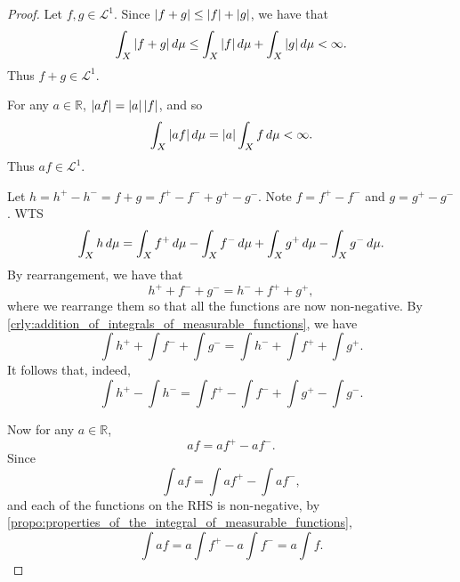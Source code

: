 \documentclass[notoc,notitlepage]{tufte-book}
\begin{document}
\begin{proof}
  Let $f, g \in \mathcal{L}^1$. Since $\left|f + g\right| \leq \left|f\right| + \left|g\right|$,
  we have that
  \begin{equation*}
    \int_{X} \left|f + g\right| \mathop{}\!d{\mu}
    \leq \int_{X} \left|f\right| \mathop{}\!d{\mu} + \int_{X} \left|g\right| \mathop{}\!d{\mu}
    < \infty.
  \end{equation*}
  Thus $f + g \in \mathcal{L}^1$.

  For any $a \in \mathbb{R}$, $\left|af\right| = \left|a\right|\left|f\right|$,
  and so
  \begin{equation*}
    \int_{X} \left|af\right| \mathop{}\!d{\mu} = \left|a\right| \int_{X} f \mathop{}\!d{\mu} < \infty.
  \end{equation*}
  Thus $af \in \mathcal{L}^1$.

  \noindent
  Let $h = h^+ - h^- = f + g = f^+ - f^- + g^+ - g^-$.
  Note $f = f^+ - f^-$ and $g = g^+ - g^-$.
  WTS
  \begin{equation*}
    \int_{X} h \mathop{}\!d{\mu}
    = \int_{X} f^+ \mathop{}\!d{\mu} - \int_{X} f^- \mathop{}\!d{\mu}
      + \int_{X} g^+ \mathop{}\!d{\mu} - \int_{X} g^- \mathop{}\!d{\mu}.
  \end{equation*}
  By rearrangement, we have that
  \begin{equation*}
    h^+ + f^- + g^- = h^- + f^+ + g^+,
  \end{equation*}
  where we rearrange them so that all the functions are now non-negative.
  By \cref{crly:addition_of_integrals_of_measurable_functions}, we have
  \begin{equation*}
    \int h^+ + \int f^- + \int g^- = \int h^- + \int f^+ + \int g^+.
  \end{equation*}
  It follows that, indeed,
  \begin{equation*}
    \int h^+ - \int h^- = \int f^+ - \int f^- + \int g^+ - \int g^-.
  \end{equation*}

  Now for any $a \in \mathbb{R}$,
  \begin{equation*}
    af = af^+ - af^-.
  \end{equation*}
  Since
  \begin{equation*}
    \int af = \int af^+ - \int af^-,
  \end{equation*}
  and each of the functions on the RHS is non-negative,
  by \cref{propo:properties_of_the_integral_of_measurable_functions},
  \begin{equation*}
    \int af = a \int f^+ - a \int f^- = a \int f.
  \end{equation*}
\end{proof}
\end{document}
